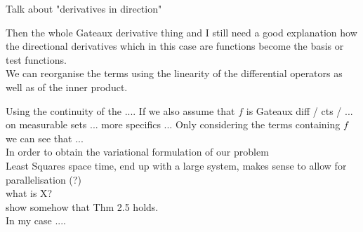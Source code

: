 \documentclass[fleqn, a4paper, 11pt, bibliography=totoc]{report}
\begin{document}
Talk about "derivatives in direction" 

Then the whole Gateaux derivative thing and I still need a good explanation how the directional derivatives which in this case are functions become the basis or test functions. 
\smallskip
\\
We can reorganise the terms using the linearity of the differential operators as well as of the inner product. 

Using the continuity of the .... If we also assume that $f$ is Gateaux diff / cts / ... on measurable sets ... more specifics ... 
Only considering the terms containing $f$ we can see that ... 
\\ 
In order to obtain the variational formulation of our problem 
\\
Least Squares space time, end up with a large system, makes sense to allow for parallelisation (?) \\
 





what is X?
\bigskip
\\
show somehow that Thm 2.5 holds. \\

In my case .... \\
\end{document}
